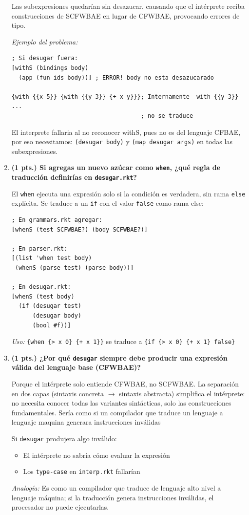 \documentclass[12pt,letterpaper]{article}
\begin{document}
\begin{enumerate}
Las subexpresiones quedarían sin desazucar, causando que el intérprete reciba construcciones de SCFWBAE en lugar de CFWBAE, provocando errores de tipo.

\textit{Ejemplo del problema:}
\begin{lstlisting}
; Si desugar fuera:
[withS (bindings body) 
  (app (fun ids body))] ; ERROR! body no esta desazucarado

{with {{x 5}} {with {{y 3}} {+ x y}}}; Internamente  with {{y 3}} ...
                                     ; no se traduce
\end{lstlisting}

El interprete fallaria al no reconocer withS, pues no es del lenguaje CFBAE, por eso necesitamos: \texttt{(desugar body)} y \texttt{(map desugar args)} en todas las subexpresiones.


\item \textbf{(1 pts.) Si agregas un nuevo azúcar como \texttt{when}, ¿qué regla de traducción definirías en \texttt{desugar.rkt}?}

El \texttt{when} ejecuta una expresión solo si la condición es verdadera, sin rama \texttt{else} explícita. Se traduce a un \texttt{if} con el valor \texttt{false} como rama else:

\begin{lstlisting}
; En grammars.rkt agregar:
[whenS (test SCFWBAE?) (body SCFWBAE?)]

; En parser.rkt:
[(list 'when test body)
 (whenS (parse test) (parse body))]

; En desugar.rkt:
[whenS (test body)
  (if (desugar test) 
      (desugar body) 
      (bool #f))]
\end{lstlisting}

\textit{Uso:} \texttt{\{when \{> x 0\} \{+ x 1\}\}} se traduce a \texttt{\{if \{> x 0\} \{+ x 1\} false\}}

\item \textbf{(1 pts.) ¿Por qué \texttt{desugar} siempre debe producir una expresión válida del lenguaje base (CFWBAE)?}

Porque el intérprete solo entiende CFWBAE, no SCFWBAE. La separación en dos capas (sintaxis concreta $\rightarrow$ sintaxis abstracta) simplifica el intérprete: no necesita conocer todas las variantes sintácticas, solo las construcciones fundamentales. Ser\'ia como si un compilador que traduce un lenguaje a lenguaje maquina generara instrucciones inv\'alidas

Si \texttt{desugar} produjera algo inválido:
\begin{itemize}
    \item El intérprete no sabría cómo evaluar la expresión
    \item Los \texttt{type-case} en \texttt{interp.rkt} fallarían
\end{itemize}

\textit{Analogía:} Es como un compilador que traduce de lenguaje alto nivel a lenguaje máquina; si la traducción genera instrucciones inválidas, el procesador no puede ejecutarlas.

\end{enumerate}
\end{document}
